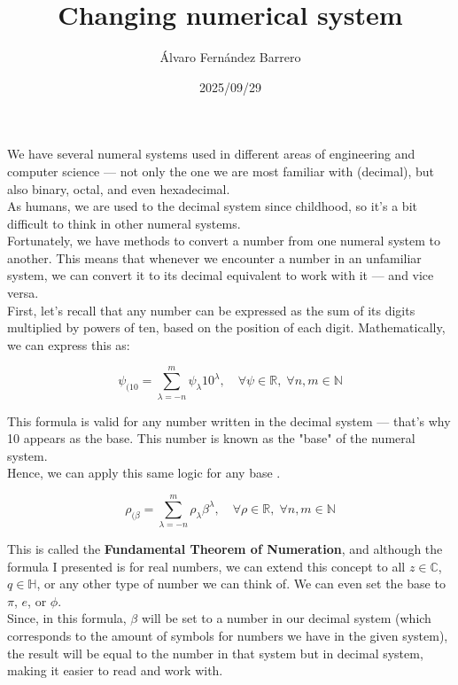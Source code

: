 \documentclass[12pt]{article}
\title{Changing numerical system}
\author{Álvaro Fernández Barrero}
\date{2025/09/29}
\begin{document}
\maketitle

We have several numeral systems used in different areas of engineering and computer science — not only the one we are most familiar with (decimal), but also binary, octal, and even hexadecimal.\\

As humans, we are used to the decimal system since childhood, so it's a bit difficult to think in other numeral systems.\\

Fortunately, we have methods to convert a number from one numeral system to another. This means that whenever we encounter a number in an unfamiliar system, we can convert it to its decimal equivalent to work with it — and vice versa.\\

First, let's recall that any number can be expressed as the sum of its digits multiplied by powers of ten, based on the position of each digit. Mathematically, we can express this as:

\[
    \psi_{(10} = \sum_{\lambda = -n}^{m} \psi_{\lambda} 10^{\lambda}, \quad \forall \psi \in \mathbb{R}, \; \forall n,m \in \mathbb{N}
\]

This formula is valid for any number written in the decimal system — that's why 10 appears as the base. This number is known as the "base" of the numeral system.\\

Hence, we can apply this same logic for any base \beta.

\[
	\rho_{(\beta} = \sum_{\lambda = -n}^{m} \rho_{\lambda} \beta^{\lambda}, \quad  \forall \rho \in \mathbb{R}, \; \forall n,m \in \mathbb{N}
\]

This is called the \textbf{Fundamental Theorem of Numeration}, and although the formula I presented is for real numbers, we can extend this concept to all \( z \in \mathbb{C} \), \( q \in \mathbb{H} \), or any other type of number we can think of. We can even set the base to \( \pi \), \( e \), or \( \phi \).\\

Since, in this formula, \(\beta \) will be set to a number in our decimal system (which corresponds to the amount of symbols for numbers we have in the given system), the result will be equal to the number in that system but in decimal system, making it easier to read and work with.\\
\end{document}

